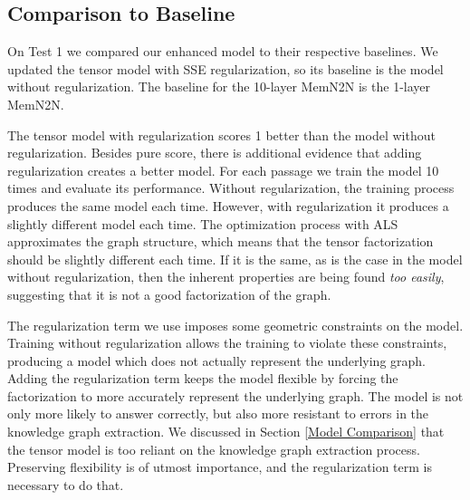\documentclass[pageno]{final_paper}
\begin{document}
\subsection{Comparison to Baseline}
\label{Comparison to Baseline}

On Test 1 we compared our enhanced model to their respective baselines. We
updated the tensor model with SSE regularization, so its baseline is the model
without regularization. The baseline for the 10-layer MemN2N is the 1-layer
MemN2N.

The tensor model with regularization scores 1 better than the model without
regularization. Besides pure score, there is additional evidence that adding
regularization creates a better model. For each passage we train the model 10
times and evaluate its performance. Without regularization, the training process
produces the same model each time. However, with regularization it produces a
slightly different model each time. The optimization process with ALS
approximates the graph structure, which means that the tensor factorization
should be slightly different each time. If it is the same, as is the case in the
model without regularization, then the inherent properties are being found
\textit{too easily}, suggesting that it is not a good factorization of the
graph.

The regularization term we use imposes some geometric constraints on the model.
Training without regularization allows the training to violate these
constraints, producing a model which does not actually represent the underlying
graph. Adding the regularization term keeps the model flexible by forcing the
factorization to more accurately represent the underlying graph. The model is
not only more likely to answer correctly, but also more resistant to errors in
the knowledge graph extraction. We discussed in Section \ref{Model Comparison}
that the tensor model is too reliant on the knowledge graph extraction process.
Preserving flexibility is of utmost importance, and the regularization term is
necessary to do that.
\end{document}
